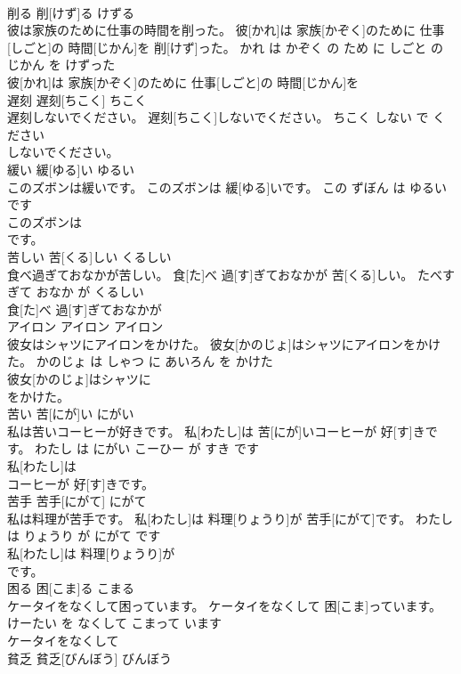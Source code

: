 \documentclass[8pt]{extreport}
\begin{document}
\begin{CJK}{UTF8}{min}
\\	削る	削[けず]る	けずる	
\\	彼は家族のために仕事の時間を削った。	彼[かれ]は 家族[かぞく]のために 仕事[しごと]の 時間[じかん]を 削[けず]った。	かれ は かぞく の ため に しごと の じかん を けずった	
\\	彼[かれ]は 家族[かぞく]のために 仕事[しごと]の 時間[じかん]を
\\	遅刻	遅刻[ちこく]	ちこく	
\\	遅刻しないでください。	遅刻[ちこく]しないでください。	ちこく しない で ください	
\\	しないでください。		
\\	緩い	緩[ゆる]い	ゆるい	
\\	このズボンは緩いです。	このズボンは 緩[ゆる]いです。	この ずぼん は ゆるい です	
\\	このズボンは
\\	です。		
\\	苦しい	苦[くる]しい	くるしい	
\\	食べ過ぎておなかが苦しい。	食[た]べ 過[す]ぎておなかが 苦[くる]しい。	たべすぎて おなか が くるしい	
\\	食[た]べ 過[す]ぎておなかが
\\	アイロン	アイロン	アイロン	
\\	彼女はシャツにアイロンをかけた。	彼女[かのじょ]はシャツにアイロンをかけた。	かのじょ は しゃつ に あいろん を かけた	
\\	彼女[かのじょ]はシャツに
\\	をかけた。		
\\	苦い	苦[にが]い	にがい	
\\	私は苦いコーヒーが好きです。	私[わたし]は 苦[にが]いコーヒーが 好[す]きです。	わたし は にがい こーひー が すき です	
\\	私[わたし]は
\\	コーヒーが 好[す]きです。		
\\	苦手	苦手[にがて]	にがて	
\\	私は料理が苦手です。	私[わたし]は 料理[りょうり]が 苦手[にがて]です。	わたし は りょうり が にがて です	
\\	私[わたし]は 料理[りょうり]が
\\	です。		
\\	困る	困[こま]る	こまる	
\\	ケータイをなくして困っています。	ケータイをなくして 困[こま]っています。	けーたい を なくして こまって います	
\\	ケータイをなくして
\\	貧乏	貧乏[びんぼう]	びんぼう	

\end{CJK}
\end{document}
